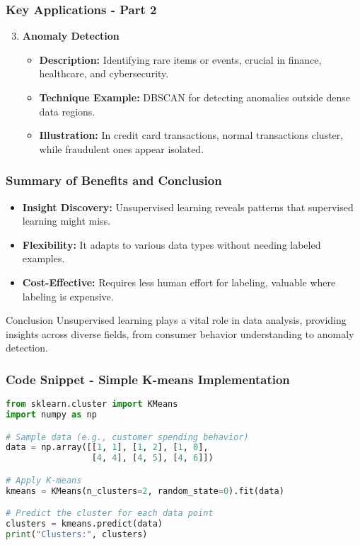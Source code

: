 \documentclass[aspectratio=169]{beamer}
\begin{document}
\begin{frame}[fragile]
    \frametitle{Key Applications - Part 2}
    \begin{enumerate}
        \setcounter{enumi}{2} %
        \item \textbf{Anomaly Detection}
            \begin{itemize}
                \item \textbf{Description:} Identifying rare items or events, crucial in finance, healthcare, and cybersecurity.
                \item \textbf{Technique Example:} DBSCAN for detecting anomalies outside dense data regions.
                \item \textbf{Illustration:} In credit card transactions, normal transactions cluster, while fraudulent ones appear isolated.
            \end{itemize}
    \end{enumerate}
\end{frame}

\begin{frame}[fragile]
    \frametitle{Summary of Benefits and Conclusion}
    \begin{itemize}
        \item \textbf{Insight Discovery:} Unsupervised learning reveals patterns that supervised learning might miss.
        \item \textbf{Flexibility:} It adapts to various data types without needing labeled examples.
        \item \textbf{Cost-Effective:} Requires less human effort for labeling, valuable where labeling is expensive.
    \end{itemize}
    
    \begin{block}{Conclusion}
        Unsupervised learning plays a vital role in data analysis, providing insights across diverse fields, from consumer behavior understanding to anomaly detection.
    \end{block}
\end{frame}

\begin{frame}[fragile]
    \frametitle{Code Snippet - Simple K-means Implementation}
    \begin{lstlisting}[language=Python]
from sklearn.cluster import KMeans
import numpy as np

# Sample data (e.g., customer spending behavior)
data = np.array([[1, 1], [1, 2], [1, 0],
                 [4, 4], [4, 5], [4, 6]])

# Apply K-means
kmeans = KMeans(n_clusters=2, random_state=0).fit(data)

# Predict the cluster for each data point
clusters = kmeans.predict(data)
print("Clusters:", clusters)
    \end{lstlisting}
\end{frame}
\end{document}
